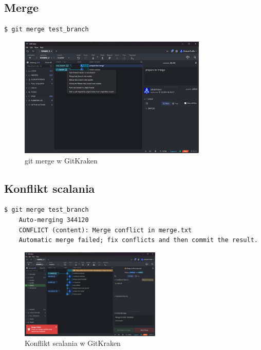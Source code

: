 \documentclass[a4paper,12pt]{article}
\begin{document}
\subsection{Merge}
\begin{lstlisting}[caption={Scalanie w terminalu},captionpos=b]
    $ git merge test_branch
\end{lstlisting}
\begin{figure}[ht]
    \centering
    \includegraphics[width=0.8\textwidth]{images/merge.png}
    \caption{git merge w GitKraken}
\end{figure}

\newpage
\clearpage

\subsection{Konflikt scalania}
\begin{lstlisting}[caption={Konflikt scalania w terminalu},captionpos=b]
    $ git merge test_branch
    Auto-merging 344120
    CONFLICT (content): Merge conflict in merge.txt
    Automatic merge failed; fix conflicts and then commit the result.
\end{lstlisting}
\begin{figure}[ht]
    \centering
    \includegraphics[width=0.6\textwidth]{images/conflict.png}
    \caption{Konflikt scalania w GitKraken}
\end{figure}
\end{document}
